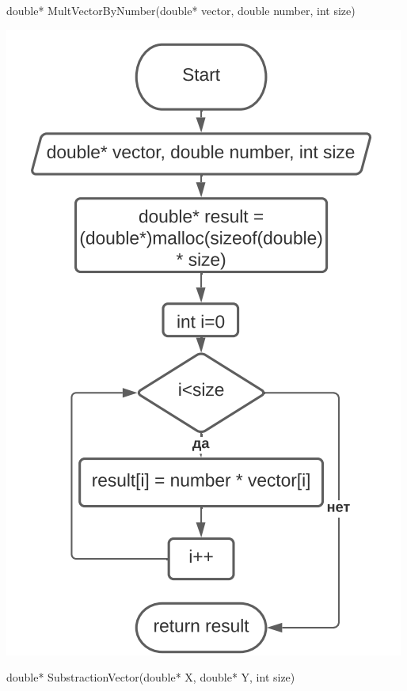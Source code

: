 double* MultVectorByNumber(double* vector, double number, int size)

\includegraphics[scale=0.5]{block5.png}

double* SubstractionVector(double* X, double* Y, int size)

